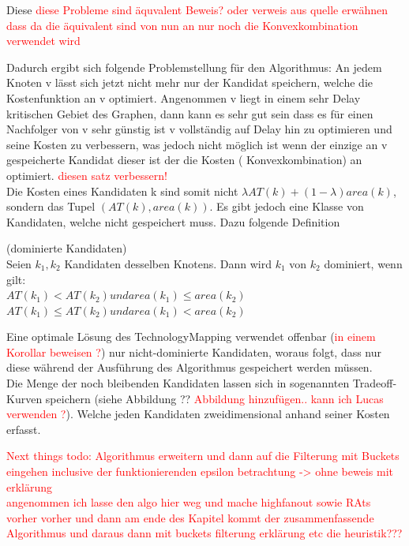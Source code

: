 \documentclass[11pt, a4paper, german]{article}
\newcommand{\TM}{TechnologyMapping }
\begin{document}
Diese \textcolor{red}{diese Probleme sind äquvalent Beweis? oder verweis aus quelle}
\textcolor{red}{erwähnen dass da die äquivalent sind von nun an nur noch die Konvexkombination verwendet wird}

Dadurch ergibt sich folgende Problemstellung für den Algorithmus: An jedem Knoten v lässt sich jetzt nicht mehr nur der Kandidat speichern, welche die Kostenfunktion an v optimiert. Angenommen v liegt in einem sehr Delay kritischen Gebiet des Graphen, dann kann es sehr gut sein dass es für einen Nachfolger von v sehr günstig ist v vollständig auf Delay hin zu optimieren und seine Kosten zu verbessern, was jedoch nicht möglich ist wenn der einzige an v gespeicherte Kandidat dieser ist der die Kosten ( Konvexkombination) an optimiert. \textcolor{red}{diesen satz verbessern!}\\
Die Kosten eines Kandidaten k sind somit nicht $\lambda AT(k) +(1-\lambda )area(k)$,  sondern das Tupel $(AT(k), area(k))$.
Es gibt jedoch eine Klasse von Kandidaten, welche nicht gespeichert muss. Dazu folgende Definition\\

\begin{definition}{(dominierte Kandidaten)}\\
	Seien $k_1, k_2$ Kandidaten desselben Knotens. Dann wird $k_1$ von $k_2$ dominiert, wenn gilt:\\
	$AT(k_1) < AT(k_2) und area(k_1) \leq area(k_2)$\\
	$	AT(k_1) \leq AT(k_2) und area(k_1) < area(k_2)$\\	
\end{definition}

Eine optimale Lösung des \TM verwendet offenbar (\textcolor{red}{in einem Korollar beweisen ?}) nur nicht-dominierte Kandidaten, woraus folgt, dass nur diese während der Ausführung des Algorithmus gespeichert werden müssen.\\
Die Menge der noch bleibenden Kandidaten lassen sich in sogenannten Tradeoff-Kurven speichern (siehe Abbildung ?? \textcolor{red}{Abbildung hinzufügen.. kann ich Lucas verwenden ?}). Welche jeden Kandidaten zweidimensional anhand seiner Kosten erfasst.


\textcolor{red}{Next things todo: Algorithmus erweitern und dann auf die Filterung mit Buckets eingehen inclusive der funktionierenden epsilon betrachtung -> ohne beweis mit erklärung\\ 
angenommen ich lasse den algo hier weg und mache highfanout sowie RAts vorher vorher und dann am ende des Kapitel kommt der zusammenfassende Algorithmus und daraus dann mit buckets filterung erklärung etc die heuristik???}
\end{document}
